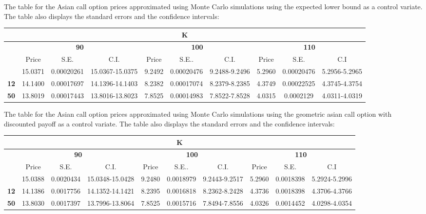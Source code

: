 \documentclass[10pt,oneside,a4paper]{article}
\begin{document}
\begin{flushleft}
\subsubsection{}
The table for the Asian call option prices approximated using Monte Carlo simulations using the expected lower bound as a control variate. The table also displays the standard errors and the confidence intervals:
\begin{center}
\begin{tabular}{|c|c|c|c|c|c|c|c|c|c|}
\multicolumn{10}{c}{K} \tabularnewline
\hline
\multirow{3}{*}{} & \multicolumn{3}{c|}{\bfseries 90}  & \multicolumn{3}{c|}{\bfseries 100} & \multicolumn{3}{c|}{\bfseries 110} \\
\cline{2-10}
 & Price & S.E. & C.I. & Price & S.E.. & C.I. & Price & S.E. & C.I \\
\hline
 \bfseries 4 & 15.0371 &  0.00020261 & 15.0367-15.0375 & 9.2492 & 0.00020476 & 9.2488-9.2496 & 5.2960 & 0.00020476 & 5.2956-5.2965   \\
\hline
 \bfseries 12 & 14.1400 & 0.00017697 & 14.1396-14.1403 & 8.2382 & 0.00017074  & 8.2379-8.2385 & 4.3749 & 0.00022525 &4.3745-4.3754 \\
\hline
 \bfseries 50 & 13.8019 & 0.00017443 & 13.8016-13.8023 & 7.8525 & 0.00014983 & 7.8522-7.8528 & 4.0315 & 0.0002129& 4.0311-4.0319 \\
  \hline
\end{tabular}
\end{center}
 


The table for the Asian call option prices approximated using Monte Carlo simulations using the geometric asian call option with discounted payoff as a control variate. The table also displays the standard errors and the confidence intervals:
\begin{center}
\begin{tabular}{|c|c|c|c|c|c|c|c|c|c|}
\multicolumn{10}{c}{K} \tabularnewline
\hline
\multirow{3}{*}{} & \multicolumn{3}{c|}{\bfseries 90}  & \multicolumn{3}{c|}{\bfseries 100} & \multicolumn{3}{c|}{\bfseries 110} \\
\cline{2-10}
 & Price & S.E. & C.I. & Price & S.E.. & C.I. & Price & S.E. & C.I \\
\hline
 \bfseries 4 & 15.0388 &  0.0020434 & 15.0348-15.0428 & 9.2480 & 0.0018979 & 9.2443-9.2517 & 5.2960 & 0.0018398 & 5.2924-5.2996   \\
\hline
 \bfseries 12 & 14.1386 & 0.0017756 & 14.1352-14.1421 & 8.2395 & 0.0016818  & 8.2362-8.2428 & 4.3736 & 0.0018398 &4.3706-4.3766 \\
\hline
 \bfseries 50 & 13.8030 & 0.0017397 & 13.7996-13.8064 & 7.8525 & 0.0015716 & 7.8494-7.8556 & 4.0326 & 0.0014452 & 4.0298-4.0354 \\ 
  \hline
\end{tabular}
\end{center}


\end{flushleft}
\end{document}
